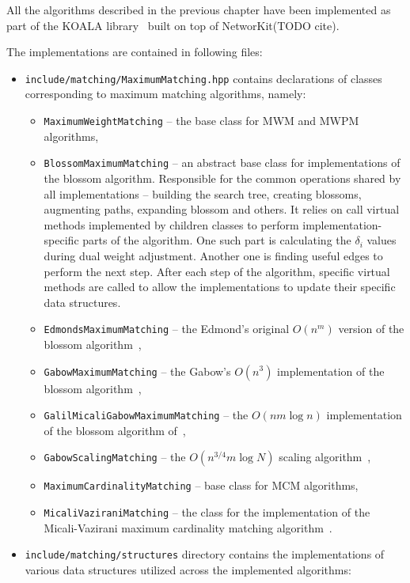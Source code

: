 All the algorithms described in the previous chapter have been implemented as part of the KOALA library~\cite{koala-networkit} built on top of NetworKit(TODO cite). 

The implementations are contained in following files:

\begin{itemize}
    \item \texttt{include/matching/MaximumMatching.hpp} contains declarations of classes corresponding to maximum matching algorithms, namely: \begin{itemize}
        \item \texttt{MaximumWeightMatching} – the base class for \textsc{MWM} and \textsc{MWPM} algorithms,
        \item \texttt{BlossomMaximumMatching} – an abstract base class for implementations of the blossom algorithm. Responsible for the common operations shared by all implementations – building the search tree, creating blossoms, augmenting paths, expanding blossom and others. It relies on call virtual methods implemented by children classes to perform implementation-specific parts of the algorithm. One such part is calculating the $\delta_i$ values during dual weight adjustment. Another one is finding useful edges to perform the next step. After each step of the algorithm, specific virtual methods are called to allow the implementations to update their specific data structures.
        \item \texttt{EdmondsMaximumMatching} – the Edmond's original $O(n^m)$ version of the blossom algorithm~\cite{edmonds1965maximum},
        \item \texttt{GabowMaximumMatching} – the Gabow's $O(n^3)$ implementation of the blossom algorithm~\cite{gabow1974implementation},
        \item \texttt{GalilMicaliGabowMaximumMatching} – the $O(nm\log n)$ implementation of the blossom algorithm of~\cite{galil1986ev},
        \item \texttt{GabowScalingMatching} – the $O(n^{3/4}m\log N)$ scaling algorithm~\cite{gabow1984scaling},
        \item \texttt{MaximumCardinalityMatching} – base class for \textsc{MCM} algorithms,
        \item \texttt{MicaliVaziraniMatching} – the class for the implementation of the Micali-Vazirani maximum cardinality matching algorithm~\cite{micali1980v}.
    \end{itemize}
    \item \texttt{include/matching/structures} directory contains the implementations of various data structures utilized across the implemented algorithms: \begin{itemize}

\end{itemize}
\end{itemize}
